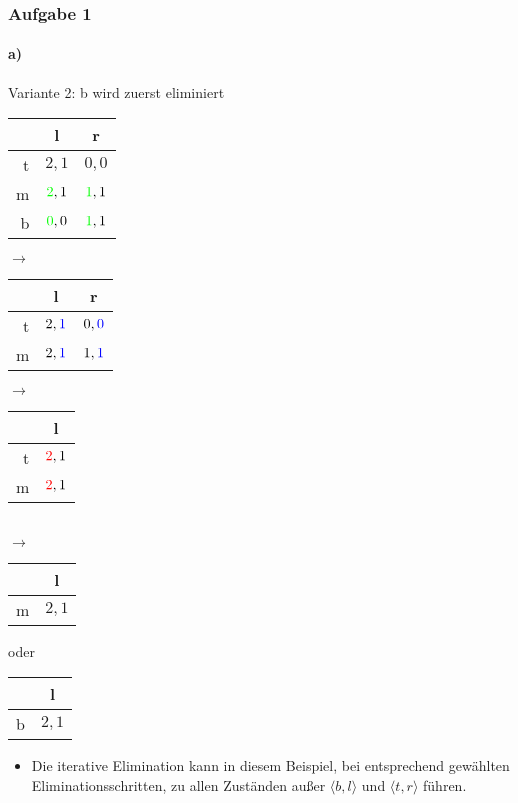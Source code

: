 \documentclass{beamer}
\begin{document}
\begin{frame}
	\frametitle{Aufgabe 1}
	\framesubtitle{a)}
	\begin{block}{Variante 2: b wird zuerst eliminiert}	
		\centering
		\begin{tabular}{r|c|c|}
			& l & r \\
			\hline
			t & $2, 1$ & $0, 0$ \\
			m & $\textcolor{green}{2}, 1$ & $\textcolor{green}{1}, 1$ \\
			b & $\textcolor{green}{0}, 0$ & $\textcolor{green}{1}, 1$ \\
			\hline
		\end{tabular}
		$\rightarrow$
		\begin{tabular}{r|c|c|}
			& l & r \\
			\hline
			t & $2, \textcolor{blue}{1}$ & $0, \textcolor{blue}{0}$ \\
			m & $2, \textcolor{blue}{1}$ & $1, \textcolor{blue}{1}$ \\
			\hline
		\end{tabular}
		$\rightarrow$
		\begin{tabular}{r|c|}
			& l \\
			\hline
			t &  $\textcolor{red}{2}, 1$ \\
			m & $\textcolor{red}{2}, 1$ \\
			\hline
		\end{tabular}\\
		$\rightarrow$
		\begin{tabular}{r|c|}
			& l \\
			\hline
			m & $2, 1$ \\
			\hline
		\end{tabular}
		oder
		\begin{tabular}{r|c|}
			& l \\
			\hline
			b &  $2, 1$ \\
			\hline
		\end{tabular}	
	\end{block}
	\begin{itemize}
		\item Die iterative Elimination kann in diesem Beispiel, bei entsprechend gewählten Eliminationsschritten, zu allen Zuständen außer $\langle b, l \rangle$ und $\langle t, r \rangle$ führen.
	\end{itemize}
\end{frame}
\end{document}
